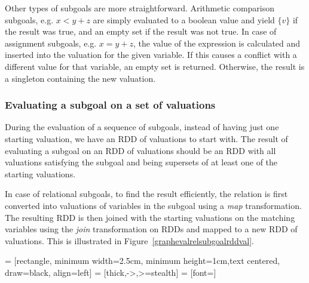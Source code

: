 Other types of subgoals are more straightforward. Arithmetic comparison subgoals, e.g. $x < y + z$ are simply evaluated to a boolean value and yield $\{v\}$ if the result was true, and an empty set if the result was not true. In case of assignment subgoals, e.g. $x = y + z$, the value of the expression is calculated and inserted into the valuation for the given variable. If this causes a conflict with a different value for that variable, an empty set is returned. Otherwise, the result is a singleton containing the new valuation.

\subsubsection{Evaluating a subgoal on a set of valuations}
During the evaluation of a sequence of subgoals, instead of having just one starting valuation, we have an RDD of valuations to start with. The result of evaluating a subgoal on an RDD of valuations should be an RDD with all valuations satisfying the subgoal and being supersets of at least one of the starting valuations.

In case of relational subgoals, to find the result efficiently, the relation is first converted into valuations of variables in the subgoal using a \emph{map} transformation. The resulting RDD is then joined with the starting valuations on the matching variables using the \emph{join} transformation on RDDs and mapped to a new RDD of valuations. This is illustrated in Figure~\ref{graphevalrelsubgoalrddval}.

 = [rectangle, minimum width=2.5cm, minimum height=1cm,text centered, draw=black, align=left]
 = [thick,->,>=stealth]
 = [font=\scriptsize]

